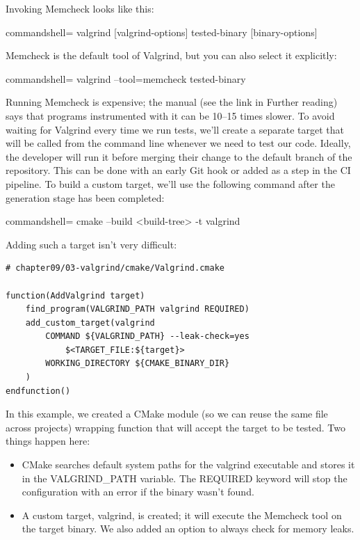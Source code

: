 Invoking Memcheck looks like this:

\begin{tcblisting}{commandshell={}}
valgrind [valgrind-options] tested-binary [binary-options]
\end{tcblisting}

Memcheck is the default tool of Valgrind, but you can also select it explicitly:

\begin{tcblisting}{commandshell={}}
valgrind --tool=memcheck tested-binary
\end{tcblisting}

Running Memcheck is expensive; the manual (see the link in Further reading) says that programs instrumented with it can be 10–15 times slower. To avoid waiting for Valgrind every time we run tests, we'll create a separate target that will be called from the command line whenever we need to test our code. Ideally, the developer will run it before merging their change to the default branch of the repository. This can be done with an early Git hook or added as a step in the CI pipeline. To build a custom target, we'll use the following command after the generation stage has been completed:

\begin{tcblisting}{commandshell={}}
cmake --build <build-tree> -t valgrind
\end{tcblisting}

Adding such a target isn't very difficult:

\begin{lstlisting}[style=styleCMake]
# chapter09/03-valgrind/cmake/Valgrind.cmake

function(AddValgrind target)
	find_program(VALGRIND_PATH valgrind REQUIRED)
	add_custom_target(valgrind
		COMMAND ${VALGRIND_PATH} --leak-check=yes
			$<TARGET_FILE:${target}>
		WORKING_DIRECTORY ${CMAKE_BINARY_DIR}
	)
endfunction()
\end{lstlisting}

In this example, we created a CMake module (so we can reuse the same file across projects) wrapping function that will accept the target to be tested. Two things happen here:

\begin{itemize}
\item 
CMake searches default system paths for the valgrind executable and stores it in the VALGRIND\_PATH variable. The REQUIRED keyword will stop the configuration with an error if the binary wasn't found.

\item 
A custom target, valgrind, is created; it will execute the Memcheck tool on the target binary. We also added an option to always check for memory leaks.
\end{itemize}

